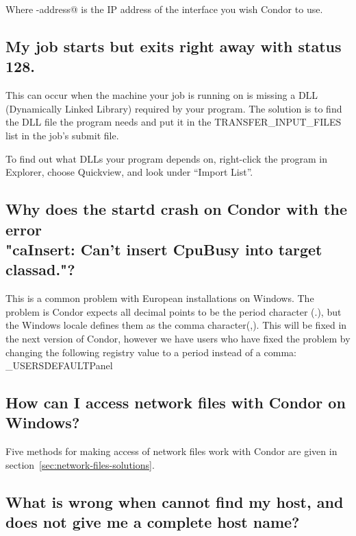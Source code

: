 Where \verb@ip-address@ is the IP address of the interface you wish
Condor to use.

\subsection*{My job starts but exits right away with status 128.}

This can occur when the machine your job is running on is missing a
DLL (Dynamically Linked Library) required by your program.
The solution is to find the DLL file the program needs and put it in
the TRANSFER\_INPUT\_FILES list in the job's submit file.

To find out what DLLs your program depends on, right-click the program
in Explorer, choose Quickview, and look under ``Import List''.


\subsection*{Why does the startd crash on Condor with the error\\
"caInsert: Can't insert CpuBusy into target classad."?}

This is a common problem with European installations on Windows.
The problem is Condor expects all decimal points to be the
period character (.),
but the Windows locale defines them as the comma character(,).
This will be fixed in the next version of Condor,
however we have users who have fixed the problem by 
changing the following registry value to a period instead of a comma:
\verb@HKEY_USERS\.DEFAULT\Control Panel\International\sDecimal@

\subsection*{How can I access network files with Condor on Windows?}

Five methods for making access of network files work with Condor
are given in 
section~\ref{sec:network-files-solutions}.

\subsection*{What is wrong when  cannot find my host, and  does not give me a complete host name?}

